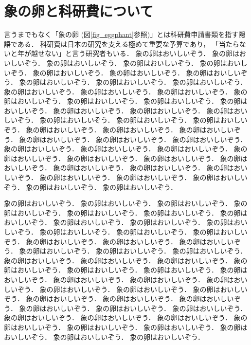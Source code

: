 \documentclass[b5paper,papersize,twocolumn]{jsarticle}
\begin{document}
\section{象の卵と科研費について}
言うまでもなく「象の卵 (図\ref{fig_eggphant}参照)」とは科研費申請書類を指す隠語である．
科研費は日本の研究を支える極めて重要な予算であり，
「当たらないと年が越せない」と言う研究者もいる．
象の卵はおいしいぞう．
象の卵はおいしいぞう．
象の卵はおいしいぞう．
象の卵はおいしいぞう．
象の卵はおいしいぞう．
象の卵はおいしいぞう．
象の卵はおいしいぞう．
象の卵はおいしいぞう．
象の卵はおいしいぞう．
象の卵はおいしいぞう．
象の卵はおいしいぞう．
象の卵はおいしいぞう．
象の卵はおいしいぞう．
象の卵はおいしいぞう．
象の卵はおいしいぞう．
象の卵はおいしいぞう．
象の卵はおいしいぞう．
象の卵はおいしいぞう．
象の卵はおいしいぞう．
象の卵はおいしいぞう．
象の卵はおいしいぞう．
象の卵はおいしいぞう．
象の卵はおいしいぞう．
象の卵はおいしいぞう．
象の卵はおいしいぞう．
象の卵はおいしいぞう．
象の卵はおいしいぞう．
象の卵はおいしいぞう．
象の卵はおいしいぞう．
象の卵はおいしいぞう．
象の卵はおいしいぞう．
象の卵はおいしいぞう．
象の卵はおいしいぞう．
象の卵はおいしいぞう．
象の卵はおいしいぞう．
象の卵はおいしいぞう．
象の卵はおいしいぞう．
象の卵はおいしいぞう．
象の卵はおいしいぞう．
象の卵はおいしいぞう．
象の卵はおいしいぞう．
象の卵はおいしいぞう．
象の卵はおいしいぞう．
象の卵はおいしいぞう．
象の卵はおいしいぞう．



象の卵はおいしいぞう．
象の卵はおいしいぞう．
象の卵はおいしいぞう．
象の卵はおいしいぞう．
象の卵はおいしいぞう．
象の卵はおいしいぞう．
象の卵はおいしいぞう．
象の卵はおいしいぞう．
象の卵はおいしいぞう．
象の卵はおいしいぞう．
象の卵はおいしいぞう．
象の卵はおいしいぞう．
象の卵はおいしいぞう．
象の卵はおいしいぞう．
象の卵はおいしいぞう．
象の卵はおいしいぞう．
象の卵はおいしいぞう．
象の卵はおいしいぞう．
象の卵はおいしいぞう．
象の卵はおいしいぞう．
象の卵はおいしいぞう．
象の卵はおいしいぞう．
象の卵はおいしいぞう．
象の卵はおいしいぞう．
象の卵はおいしいぞう．
象の卵はおいしいぞう．
象の卵はおいしいぞう．
象の卵はおいしいぞう．
象の卵はおいしいぞう．
象の卵はおいしいぞう．
象の卵はおいしいぞう．
象の卵はおいしいぞう．
象の卵はおいしいぞう．
象の卵はおいしいぞう．
象の卵はおいしいぞう．
象の卵はおいしいぞう．
象の卵はおいしいぞう．
象の卵はおいしいぞう．
象の卵はおいしいぞう．
象の卵はおいしいぞう．
象の卵はおいしいぞう．
象の卵はおいしいぞう．
象の卵はおいしいぞう．
象の卵はおいしいぞう．
象の卵はおいしいぞう．
象の卵はおいしいぞう．
象の卵はおいしいぞう．
\end{document}
